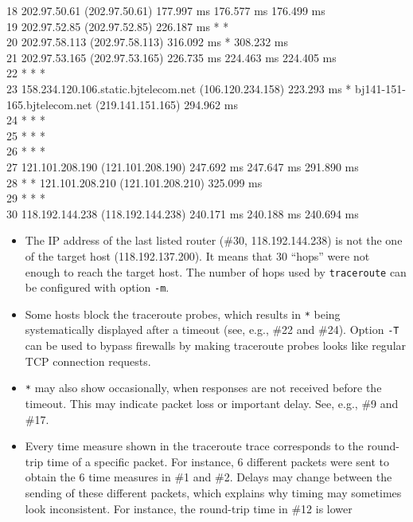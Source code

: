 \documentclass{llncs}
\newcounter{ques}
\begin{document}
{\begin{tiny}
18  202.97.50.61 (202.97.50.61)  177.997 ms  176.577 ms  176.499 ms\\
19  202.97.52.85 (202.97.52.85)  226.187 ms * *\\
20  202.97.58.113 (202.97.58.113)  316.092 ms *  308.232 ms\\
21  202.97.53.165 (202.97.53.165)  226.735 ms  224.463 ms  224.405 ms\\
22  * * *\\
23  158.234.120.106.static.bjtelecom.net (106.120.234.158)  223.293 ms * bj141-151-165.bjtelecom.net (219.141.151.165)  294.962 ms\\
24  * * *\\
25  * * *\\
26  * * *\\
27  121.101.208.190 (121.101.208.190)  247.692 ms  247.647 ms  291.890 ms\\
28  * * 121.101.208.210 (121.101.208.210)  325.099 ms\\
29  * * *\\
30  118.192.144.238 (118.192.144.238)  240.171 ms  240.188 ms  240.694 ms\\
\end{tiny}
  \begin{itemize}
  \item The IP address of the last listed router (\#30,
    118.192.144.238) is not the one of the target host
    (118.192.137.200). It means that 30 ``hops'' were not enough to
    reach the target host. The number of hops used by
    \texttt{traceroute} can be configured with option \texttt{-m}.
    \item Some hosts block the traceroute probes, which results in
      \texttt{*} being systematically displayed after a timeout (see,
      e.g., \#22 and \#24). Option \texttt{-T} can be used to bypass
      firewalls by making traceroute probes looks like regular TCP
      connection requests.
    \item \texttt{*} may also show occasionally, when responses are not received before the timeout. This may indicate packet loss or important delay. See, e.g., \#9 and \#17.
    \item Every time measure shown in the traceroute trace corresponds
      to the round-trip time of a specific packet. For instance, 6
      different packets were sent to obtain the 6 time measures in \#1
      and \#2. Delays may change between the sending of these different
      packets, which explains why timing may sometimes look
      inconsistent. For instance, the round-trip time in \#12 is lower

\end{itemize}}
\end{document}

